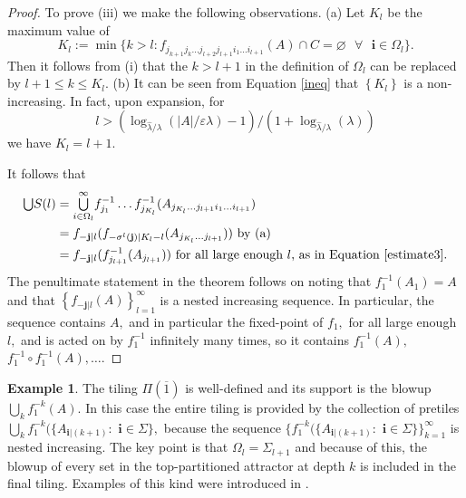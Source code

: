 \documentclass{amsproc}%
\theoremstyle{plain}
\theoremstyle{definition}
\newtheorem{example}{Example}
\numberwithin{equation}{section}
\begin{document}
\begin{proof}
To prove (iii) we make the following observations. (a) Let $K_{l}$ be the
maximum value of
\[
K_{l}:=\min\{k>l:f_{j_{k+1}j_{k}\dots j_{l+2}j_{l+1}i_{1}\dots i_{l+1}}(A)\cap
C=\varnothing\text{ }\forall\text{ }\mathbf{i}\in\Omega_{l}\}.
\]
Then it follows from (i) that the $k>l+1$ in the definition of $\Omega_{l}$
can be replaced by $l+1\leq k\leq K_{l}.$ (b) It can be seen from Equation
\ref{ineq} that $\left\{  K_{l}\right\}  $ is a non-increasing. In fact, upon
expansion, for%
\begin{equation}
l>(\log_{\widehat{\lambda}/\lambda}(|A|/\varepsilon\lambda)-1)/(1+\log
_{\widehat{\lambda}/\lambda}(\lambda)) \label{estimate3}%
\end{equation}
we have $K_{l}=l+1$.

It follows that
\begin{align*}%
{\textstyle\bigcup}
S(l)  &  =%
{\textstyle\bigcup\limits_{i\in\Omega_{l}}^{\infty}}
f_{j_{1}}^{-1}\dots f_{j_{K_{l}}}^{-1}(A_{j_{K_{l}}\dots j_{l+1}i_{1}\dots
i_{l+1}})\\
&  =f_{-\mathbf{j}|l}(f_{-\sigma^{l}(\mathbf{j)|}K_{l}-l}(A_{j_{K_{l}}\dots
j_{l+1}}))\text{ by (a)}\\
&  =f_{-\mathbf{j}|l}(f_{j_{l+1}}^{-1}(A_{j_{l+1}}))\text{ for all large
enough }l\text{, as in Equation \ref{estimate3}.}%
\end{align*}
The penultimate statement in the theorem follows on noting that $f_{1}%
^{-1}(A_{1})=A$ and that $\left\{  f_{-\mathbf{j}|l}(A)\right\}
_{l=1}^{\infty}$ is a nested increasing sequence. In particular, the sequence
contains $A,$ and in particular the fixed-point of $f_{1},$ for all large
enough $l,$ and is acted on by $f_{1}^{-1}$ infinitely many times, so it
contains $f_{1}^{-1}(A),$ $f_{1}^{-1}\circ f_{1}^{-1}(A),\dots.$
\end{proof}

\begin{example}
\label{example1}The tiling $\Pi(\overline{1})$ is well-defined and its support
is the blowup ${\textstyle\bigcup\limits_{k}}f_{1}^{-k}(A).$ In this case the
entire tiling is provided by the collection of pretiles $%
{\textstyle\bigcup\limits_{k}}
f_{1}^{-k}(\{A_{\mathbf{i}|(k+1)}:$ $\mathbf{i\in}\Sigma\mathbf{\},}$ because
the sequence $\{f_{1}^{-k}(\{A_{\mathbf{i}|(k+1)}:$ $\mathbf{i\in}%
\Sigma\mathbf{\}\}}_{k=1}^{\infty}$ is nested increasing. The key point is
that $\Omega_{l}=\Sigma_{l+1}$ and because of this, the blowup of every set in
the top-partitioned attractor at depth $k$ is included in the final tiling.
Examples of this kind were introduced in \cite{BB}.
\end{example}
\end{document}

